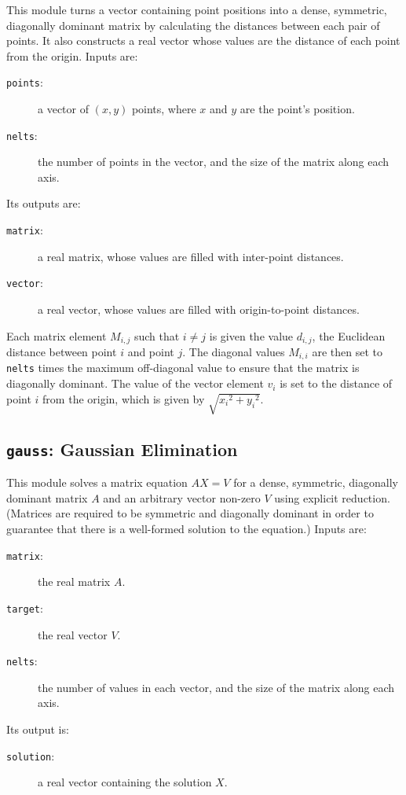 This module turns a vector containing point positions
into a dense, symmetric, diagonally dominant matrix
by calculating the distances between each pair of points.
It also constructs a real vector whose values are
the distance of each point from the origin.
Inputs are:
\begin{description}
\item[{\tt{points}}:]
	a vector of $(x,y)$ points, where $x$ and $y$ are the point's position.
\item[{\tt{nelts}}:]
	the number of points in the vector, and the size of the matrix along each axis.
\end{description}
Its outputs are:
\begin{description}
\item[{\tt{matrix}}:]
	a real matrix, whose values are filled with inter-point distances.
\item[{\tt{vector}}:]
	a real vector, whose values are filled with origin-to-point distances.
\end{description}
Each matrix element $M_{i,j}$ such that $i \neq j$
is given the value $d_{i, j}$,
the Euclidean distance between point $i$ and point $j$.
The diagonal values $M_{i, i}$ are then set to
{\tt{nelts}} times the maximum off-diagonal value
to ensure that the matrix is diagonally dominant.
The value of the vector element $v_i$ is set to
the distance of point $i$ from the origin,
which is given by $\sqrt{{x_i}^2 + {y_i}^2}$.

\subsection{{\tt{gauss}}:
	Gaussian Elimination
	\label{s:toys-gauss}}

This module solves a matrix equation $AX=V$ for
a dense, symmetric, diagonally dominant matrix $A$
and an arbitrary vector non-zero $V$
using explicit reduction.
(Matrices are required to be symmetric and diagonally dominant in order to guarantee that
there is a well-formed solution to the equation.)
Inputs are:
\begin{description}
\item[{\tt{matrix}}:]
	the real matrix $A$.
\item[{\tt{target}}:]
	the real vector $V$.
\item[{\tt{nelts}}:]
	the number of values in each vector, and the size of the matrix along each axis.
\end{description}
Its output is:
\begin{description}
\item[{\tt{solution}}:]
	a real vector containing the solution $X$.
\end{description}

